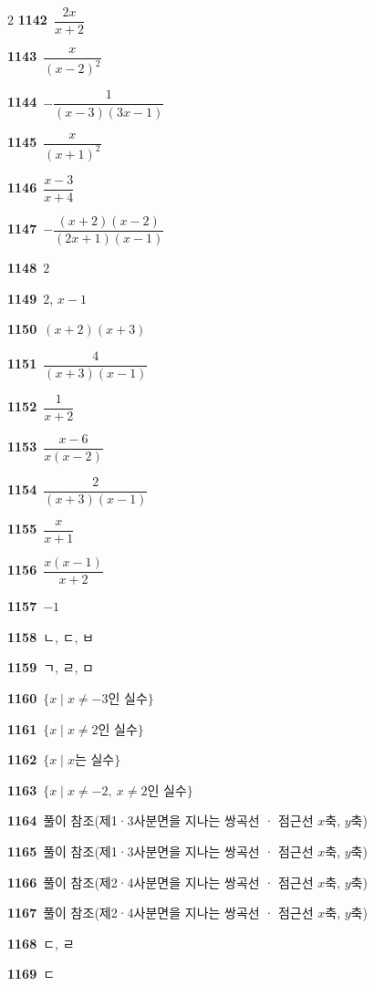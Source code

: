 \documentclass[10pt,a4paper]{article}
\begin{document}
\begin{multicols}{2}
\noindent\textbf{1142}\ $\dfrac{2x}{x+2}$\par
\noindent\textbf{1143}\ $\dfrac{x}{(x-2)^2}$\par
\noindent\textbf{1144}\ $-\dfrac{1}{(x-3)(3x-1)}$\par
\noindent\textbf{1145}\ $\dfrac{x}{(x+1)^2}$\par
\noindent\textbf{1146}\ $\dfrac{x-3}{x+4}$\par
\noindent\textbf{1147}\ $-\dfrac{(x+2)(x-2)}{(2x+1)(x-1)}$\par
\noindent\textbf{1148}\ $2$\par
\noindent\textbf{1149}\ $2$, $x-1$\par
\noindent\textbf{1150}\ $(x+2)(x+3)$\par
\noindent\textbf{1151}\ $\dfrac{4}{(x+3)(x-1)}$\par
\noindent\textbf{1152}\ $\dfrac{1}{x+2}$\par
\noindent\textbf{1153}\ $\dfrac{x-6}{x(x-2)}$\par
\noindent\textbf{1154}\ $\dfrac{2}{(x+3)(x-1)}$\par
\noindent\textbf{1155}\ $\dfrac{x}{x+1}$\par
\noindent\textbf{1156}\ $\dfrac{x(x-1)}{x+2}$\par
\noindent\textbf{1157}\ $-1$\par
\noindent\textbf{1158}\ ㄴ, ㄷ, ㅂ\par
\noindent\textbf{1159}\ ㄱ, ㄹ, ㅁ\par
\noindent\textbf{1160}\ $\{x \mid x\ne -3$인 실수$\}$\par
\noindent\textbf{1161}\ $\{x \mid x\ne 2$인 실수$\}$\par
\noindent\textbf{1162}\ $\{x \mid x$는 실수$\}$\par
\noindent\textbf{1163}\ $\{x \mid x\ne -2,\ x\ne 2$인 실수$\}$\par
\noindent\textbf{1164}\ 풀이 참조(제1·3사분면을 지나는 쌍곡선 · 점근선 $x$축, $y$축)\par
\noindent\textbf{1165}\ 풀이 참조(제1·3사분면을 지나는 쌍곡선 · 점근선 $x$축, $y$축)\par
\noindent\textbf{1166}\ 풀이 참조(제2·4사분면을 지나는 쌍곡선 · 점근선 $x$축, $y$축)\par
\noindent\textbf{1167}\ 풀이 참조(제2·4사분면을 지나는 쌍곡선 · 점근선 $x$축, $y$축)\par
\noindent\textbf{1168}\ ㄷ, ㄹ\par
\noindent\textbf{1169}\ ㄷ\par

\end{multicols}
\end{document}
